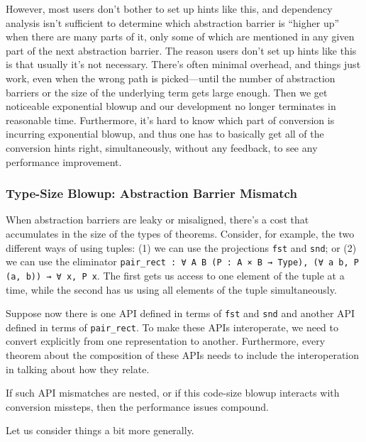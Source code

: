 However, most users don't bother to set up hints like this, and dependency analysis isn't sufficient to determine which abstraction barrier is ``higher up'' when there are many parts of it, only some of which are mentioned in any given part of the next abstraction barrier.
The reason users don't set up hints like this is that usually it's not necessary.
There's often minimal overhead, and things just work, even when the wrong path is picked---until the number of abstraction barriers or the size of the underlying term gets large enough.
Then we get noticeable exponential blowup and our development no longer terminates in reasonable time.
Furthermore, it's hard to know which part of conversion is incurring exponential blowup, and thus one has to basically get all of the conversion hints right, simultaneously, without any feedback, to see any performance improvement.



\subsubsection{Type-Size Blowup: Abstraction Barrier Mismatch} \label{sec:abstraction-barriers:mismatch}
When abstraction barriers are leaky or misaligned, there's a cost that accumulates in the size of the types of theorems.
Consider, for example, the two different ways of using tuples:
(1) we can use the projections \texttt{fst} and \texttt{snd}; or
(2) we can use the eliminator \texttt{pair_rect : ∀ A B (P : A × B → Type), (∀ a b, P (a, b)) → ∀ x, P x}.
The first gets us access to one element of the tuple at a time, while the second has us using all elements of the tuple simultaneously.

Suppose now there is one API defined in terms of \texttt{fst} and \texttt{snd} and another API defined in terms of \texttt{pair_rect}.
To make these APIs interoperate, we need to convert explicitly from one representation to another.
Furthermore, every theorem about the composition of these APIs needs to include the interoperation in talking about how they relate.

If such API mismatches are nested, or if this code-size blowup interacts with conversion missteps, then the performance issues compound.

%

%

\label{sec:abstraction-barriers:mismatch:example:exponential-laws:main-text}
Let us consider things a bit more generally.

